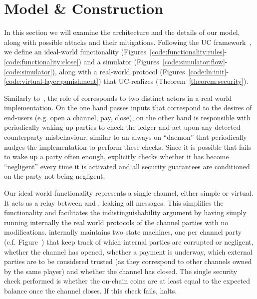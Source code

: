 \section{Model \& Construction}
  In this section we will examine the architecture and the details of our model,
  along with possible attacks and their mitigations. Following the UC
  framework~\cite{uc}, we define an ideal-world functionality \fchan
  (Figures~\ref{code:functionality:rules}-\ref{code:functionality:close}) and a
  simulator \simulator (Figures~\ref{code:simulator:flow}-\ref{code:simulator}),
  along with a real-world protocol \pchan
  (Figures~\ref{code:ln:init}-\ref{code:virtual-layer:punishment}) that
  UC-realizes \fchan (Theorem~\ref{theorem:security}).

  Similarly to~\cite{DBLP:conf/csfw/KiayiasL20}, the role of \environment
  corresponds to two distinct actors in a real world implementation. On the one
  hand \environment passes inputs that correspond to the desires of end-users
  (e.g. open a channel, pay, close), on the other hand \environment is
  responsible with periodically waking up parties to check the ledger and act
  upon any detected counterparty misbehaviour, similar to an always-on
  ``daemon'' that periodically nudges the implementation to perform these
  checks. Since it is possible that \environment fails to wake up a party often
  enough, \pchan explicitly checks whether it has become ``negligent'' every
  time it is activated and all security guarantees are conditioned on the party
  not being negligent.

  Our ideal world functionality \fchan represents a single channel, either
  simple or virtual. It acts as a relay between \adversary and \environment,
  leaking all messages. This simplifies the functionality and facilitates the
  indistinguishability argument by having \simulator simply running internally
  the real world protocols of the channel parties \pchan with no modifications.
  \fchan internally maintains two state machines, one per channel party (c.f. Figure~)
  that keep track of which internal parties are corrupted or negligent, whether
  the channel has opened, whether a payment is underway, which external parties
  are to be considered trusted (as they correspond to other channels owned by
  the same player) and whether the channel has closed. The single security check
  performed is whether the on-chain coins are at least equal to the expected
  balance once the channel closes. If this check fails, \fchan halts.

